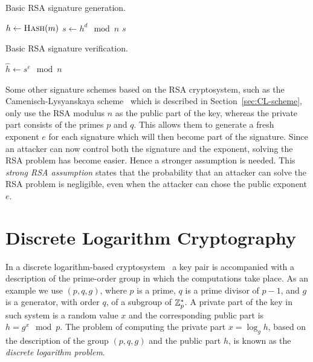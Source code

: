 \begin{algorithm}[H]
  \caption{Basic RSA signature generation.}
  \label{alg:RSA-sign}
  \addtolength{\baselineskip}{1mm}
  \begin{algorithmic}[1]
      \State $h \gets \Call{Hash}{m}$
      \State $s \gets h^d \mod n$
      \Return $s$
    \EndFunction
  \end{algorithmic}
\end{algorithm}
\begin{algorithm}[H]
  \caption{Basic RSA signature verification.}
  \label{alg:RSA-verify}
  \addtolength{\baselineskip}{1mm}
  \begin{algorithmic}[1]
      \State $\hat{h} \gets s^e \mod n$
        \Return {}
      \EndIf
      \Return {}
    \EndFunction
  \end{algorithmic}
\end{algorithm}

Some other signature schemes based on the RSA cryptosystem, such as the
Camenisch-Lysyanskaya scheme~\cite{CamenischLysyanskaya2003}
 which is described
in Section~\ref{sec:CL-scheme}, only use the RSA modulus $n$ as the public part
of the key, whereas the private part consists of the primes $p$ and $q$. This
allows them to generate a fresh exponent $e$ for each signature which will then
become part of the signature. Since an attacker can now control both the
signature and the exponent, solving the RSA problem has become easier. Hence a
stronger assumption is needed. This \emph{strong RSA assumption} states that the
probability that an attacker can solve the RSA problem is negligible, even when
the attacker can chose the public exponent $e$.

\section{Discrete Logarithm Cryptography}

In a discrete logarithm-based cryptosystem~\cite{DH1976,ElGamal1985} a key pair
is accompanied with a description of the prime-order group in which the
computations take place. As an example we use $(p, q, g)$, where $p$ is a prime,
$q$ is a prime divisor of $p-1$, and $g$ is a generator, with order $q$, of a
subgroup of $\mathbb{Z}^*_p$. A private part of the key in such system is a random value
$x$ and the corresponding public part is $h = g^x \mod p$. The problem of
computing the private part $x = \log_g h$, based on the description of the group
$(p, q, g)$ and the public part $h$, is known as the \emph{discrete logarithm
problem}.


